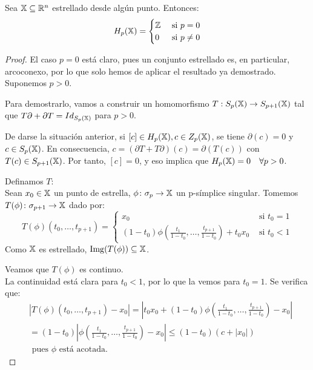 \begin{lemma}
  Sea ${\mathbb X} \subseteq \mathbb{R}^n$ estrellado desde algún punto. Entonces:
  \[ H_p({\mathbb X}) = \begin{cases}  \mathbb{Z} & \text{ si } p = 0 \\
                              0  & \text{ si } p \neq 0
                            \end{cases} \]
\end{lemma}

\begin{proof}
  El caso $p = 0$ está claro, pues un conjunto estrellado es, en particular, arcoconexo, por lo que solo hemos de aplicar el resultado ya demostrado.
  Suponemos $p > 0$.

  Para demostrarlo, vamos a construir un homomorfismo $ T: S_{p}({\mathbb X}) \to S_{p+1}({\mathbb X})$ tal que $ T \partial + \partial  T = Id_{S_{p}({\mathbb X})}$ para $p > 0$.

  De darse la situación anterior, si $[c] \in H_p({\mathbb X}), c \in Z_p({\mathbb X})$, se tiene $\partial(c) = 0$ y $c \in S_p({\mathbb X})$.
  En consecuencia, $c = (\partial  T +  T \partial)(c)  = \partial( T(c))$ con $ T(c) \in S_{p+1}({\mathbb X})$.
  Por tanto, $[c] = 0$, y eso implica que $H_p({\mathbb X}) = 0 \quad \forall p > 0$.

  Definamos $T$: \\
  Sean $x_0 \in {\mathbb X}$ un punto de estrella, $\phi \colon \sigma_p \to {\mathbb X}$ un p-símplice singular. Tomemos $T(\phi) \colon \sigma_{p+1} \to {\mathbb X}$ dado por:
  \[ T(\phi)(t_0,\dots,t_{p+1}) = \begin{cases} x_0 & \text{ si } t_0 = 1 \\
                                                (1-t_0)\phi(\frac{t_1}{1-t_0},\dots,\frac{t_{p+1}}{1-t_0}) + t_0 x_0 & \text{ si } t_0 < 1
                                  \end{cases} \]
  Como ${\mathbb X}$ es estrellado, $\operatorname{Img}(T(\phi)) \subseteq {\mathbb X}$.

  Veamos que $T(\phi)$ es continuo. \\
  La continuidad está clara para $t_0 < 1$, por lo que la vemos para $t_0 = 1$. Se verifica que:
  \begin{align*}
    &|T(\phi)(t_0,\dots,t_{p+1}) - x_0| = |t_0 x_0 + (1-t_0)\phi(\frac{t_1}{1-t_0},\dots,\frac{t_{p+1}}{1-t_0}) - x_0| \\
    &= (1-t_0)|\phi(\frac{t_1}{1-t_0},\dots,\frac{t_{p+1}}{1-t_0}) - x_0| \leq (1-t_0)(c + |x_0|) \\
    & \text{ pues $\phi$ está acotada.}
  \end{align*}


\end{proof}
